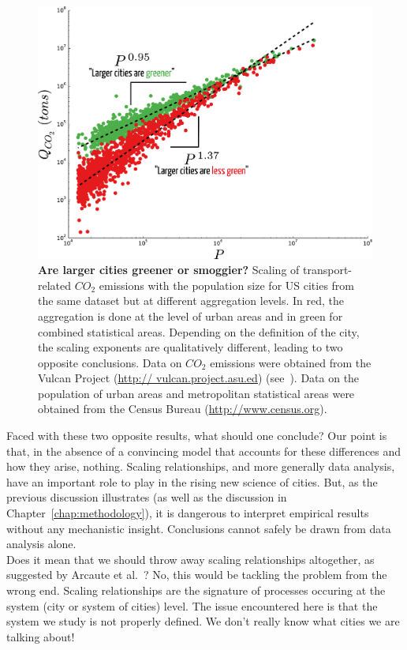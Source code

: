 \begin{figure}[!h]
	\centering
	\includegraphics[width=\textwidth]{gfx/chapter-scaling/lost_smog.pdf}
	\caption{ {\bf Are larger cities greener or smoggier?} Scaling of transport-related $CO_2$
emissions with the population size for US cities from the same dataset but at different aggregation
levels. In red, the aggregation is done at the level of urban areas and in green for combined statistical
areas. Depending on the definition of the city, the scaling exponents are qualitatively different, leading
to two opposite conclusions. Data on $CO_2$ emissions were obtained from the Vulcan Project (\url{http://
vulcan.project.asu.ed}) (see~\cite{Fragkias:2013,Oliveira:2014}). Data on the population of urban areas and
metropolitan statistical areas were obtained from the Census Bureau
(\protect\url{http://www.census.org}). \label{fig:lost}}
\end{figure}


Faced with these two opposite results, what should one conclude? Our point is that, in
the absence of a convincing model that accounts for these differences and how they arise,
nothing. Scaling relationships, and more generally data analysis, have an important role
to play in the rising new science of cities. But, as the previous discussion
illustrates (as well as the discussion in Chapter~\ref{chap:methodology}), it is
dangerous to interpret empirical results without any mechanistic insight. Conclusions cannot
safely be drawn from data analysis alone.\\

Does it mean that we should throw away scaling relationships altogether, as
suggested by Arcaute et al.~\cite{Arcaute:2014}? No, this would be tackling the
problem from the wrong end. Scaling relationships are the signature of processes
occuring at the system (city or system of cities) level. The issue encountered
here is that the system we study is not properly defined. We don't really know
what cities we are talking about! 

